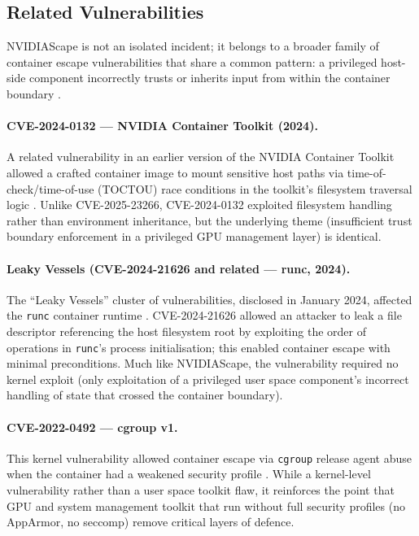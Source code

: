 \subsection{Related Vulnerabilities}
\label{subsec:related-vulns}

NVIDIAScape is not an isolated incident; it belongs to a broader family of container escape vulnerabilities that share a common pattern: a privileged host-side component incorrectly trusts or inherits input from within the container boundary \cite{lin2018measurement}.

\paragraph{CVE-2024-0132 — NVIDIA Container Toolkit (2024).} A related vulnerability in an earlier version of the NVIDIA Container Toolkit allowed a crafted container image to mount sensitive host paths via time-of-check/time-of-use (TOCTOU) race conditions in the toolkit's filesystem traversal logic \cite{nvd_cve_2024_0132}\cite{wiz_nvidia_2024}. Unlike CVE-2025-23266, CVE-2024-0132 exploited filesystem handling rather than environment inheritance, but the underlying theme (insufficient trust boundary enforcement in a privileged GPU management layer) is identical.

\paragraph{Leaky Vessels (CVE-2024-21626 and related — runc, 2024).} The ``Leaky Vessels'' cluster of vulnerabilities, disclosed in January 2024, affected the \texttt{runc} container runtime \cite{nvd_cve_2024_21626} \cite{leaky_vessels_disclosure}. CVE-2024-21626 allowed an attacker to leak a file descriptor referencing the host filesystem root by exploiting the order of operations in \texttt{runc}'s process initialisation; this enabled container escape with minimal preconditions. Much like NVIDIAScape, the vulnerability required no kernel exploit (only exploitation of a privileged user space component's incorrect handling of state that crossed the container boundary).

\paragraph{CVE-2022-0492 — cgroup v1.} This kernel vulnerability allowed container escape via \texttt{cgroup} release agent abuse when the container had a weakened security profile \cite{nvd_cve_2022_0492}. While a kernel-level vulnerability rather than a user space toolkit flaw, it reinforces the point that GPU and system management toolkit that run without full security profiles (no AppArmor, no seccomp) remove critical layers of defence.


